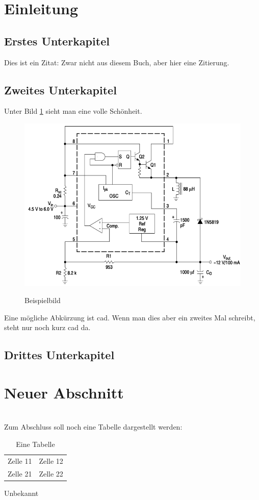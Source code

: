 \section{Einleitung}
\subsection{Erstes Unterkapitel}
Dies ist ein Zitat:
\lipsum[1-2]
Zwar nicht aus diesem Buch, aber hier eine Zitierung. \citep[vgl. ][S. 5-6]{bernstein97}
\subsection{Zweites Unterkapitel}
Unter Bild \ref{pic:bildname} sieht man eine volle Schönheit.
\begin{figure}[ht]
	\centering
	\includegraphics[scale=0.5]{pic/bildname}
	\caption{Beispielbild}
	\label{pic:bildname}
	\quelle \citep[S. 8]{onsemi:MC34063A}
\end{figure}

Eine mögliche Abkürzung ist \ac{cad}. Wenn man dies aber ein zweites Mal schreibt, steht nur noch kurz \ac{cad} da.
\subsection{Drittes Unterkapitel}
\section{Neuer Abschnitt}
\lipsum[1-3]\\

Zum Abschluss soll noch eine Tabelle dargestellt werden:
\begin{table}[H]
\centering
\begin{tabular}{c c}
Zelle 11 & Zelle 12\\
Zelle 21 & Zelle 22\\
\end{tabular}
\caption{Eine Tabelle}
\label{tab:einetabelle}
\quelle Unbekannt
\end{table}